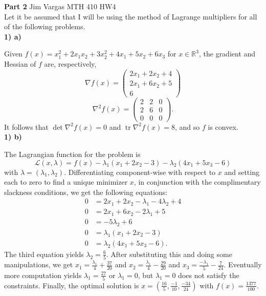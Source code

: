 \documentclass[12]{article}
\DeclareMathOperator{\tr}{tr}
\newcommand{\Lagr}{\mathscr{L}}
\begin{document}
\noindent
\textbf{Part 2} Jim Vargas MTH 410 HW4 \\

	Let it be assumed that I will be using the method of Lagrange multipliers for all of the following problems.\\
	
\noindent
\textbf{1) a)}

	Given $f(x)=x_1^2+2x_1 x_2+3x_2^2+4x_1+5x_2+6x_3$ for $x\in \mathbb{R}^3$, the gradient and Hessian of $f$ are, respectively,
	$$\displaystyle{
	\nabla f(x)=\begin{pmatrix}
	2x_1+2x_2+4 \\
	2x_1+6x_2+5\\
	6
	\end{pmatrix}
	}$$
	$$\displaystyle{
	\nabla^2 f(x)=\begin{pmatrix}
	2 & 2 & 0 \\
	2 & 6 & 0 \\
	0 & 0 & 0  
	\end{pmatrix}.
	}$$
It follows that $\det{\nabla^2 f(x)}=0$ and $\tr{\nabla^2 f(x)}=8$, and so $f$ is convex. \\

\noindent
\textbf{1) b)}

	The Lagrangian function for the problem is 
	$$\displaystyle{
	\Lagr (x,\lambda)= f(x)-{\lambda}_1 (x_1+2x_2-3) -{\lambda}_2 (4x_1+5x_3-6)
	}$$
with $\lambda=({\lambda}_1,{\lambda}_2)$. Differentiating component-wise with respect to $x$ and setting each to zero to find a unique minimizer $x$, in conjunction with the complimentary slackness conditions, we get the following equations:
\begin{align*}
0&=2x_1+2x_2-{\lambda}_1-4{\lambda}_2+4 \\
0&=2x_1+6x_2-2{\lambda}_1+5 \\
0&=-5\lambda_2+6 \\
0&=\lambda_1(x_1+2x_2-3) \\
0&=\lambda_2(4x_1+5x_3-6).
\end{align*}
The third equation yields $\displaystyle{\lambda_2=\frac{6}{5}}$. After substituting this and doing some manipulations, we get $\displaystyle x_1=\frac{\lambda_1}{4}+\frac{37}{20}$ and $\displaystyle x_2=\frac{\lambda_1}{4}-\frac{29}{20}$ and $\displaystyle x_3=\frac{-\lambda_1}{5}-\frac{7}{24}$. Eventually more computation yields $\displaystyle \lambda_1=\frac{27}{5}$ or $\lambda_1=0$, but $\lambda_1=0$ does not satisfy the constraints. Finally, the optimal solution is $\displaystyle x=\left(\frac{16}{5},\frac{-1}{10},\frac{-34}{24}\right)$ with $\displaystyle f(x)=\frac{1377}{100}$.\\
\end{document}
